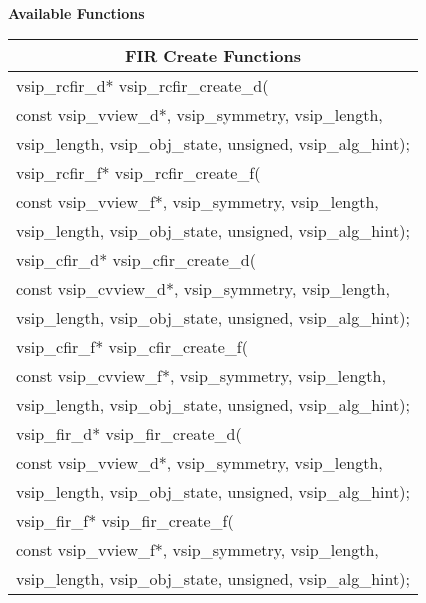 \\\cvsiplh 
\newline \hspace*{.8cm} \vspace*{.1cm} \textbf{Available Functions }
\newline \hspace*{1.cm} {
\ttfamily
\begin{tabular}[H]{|l|}
\multicolumn{1}{c}{\rmfamily \bfseries FIR Create Functions\vspace{.1cm}}\\ \hline
vsip\_rcfir\_d* vsip\_rcfir\_create\_d(\\*\hspace{.6cm}const vsip\_vview\_d*, vsip\_symmetry, vsip\_length,\\*\hspace{.6cm}vsip\_length, vsip\_obj\_state, unsigned, vsip\_alg\_hint);\\
vsip\_rcfir\_f* vsip\_rcfir\_create\_f(\\*\hspace{.6cm}const vsip\_vview\_f*, vsip\_symmetry, vsip\_length,\\*\hspace{.6cm}vsip\_length, vsip\_obj\_state, unsigned, vsip\_alg\_hint);\\
vsip\_cfir\_d* vsip\_cfir\_create\_d(\\*\hspace{.6cm}const vsip\_cvview\_d*, vsip\_symmetry, vsip\_length,\\*\hspace{.6cm}vsip\_length, vsip\_obj\_state, unsigned, vsip\_alg\_hint);\\
vsip\_cfir\_f* vsip\_cfir\_create\_f(\\*\hspace{.6cm}const vsip\_cvview\_f*, vsip\_symmetry, vsip\_length,\\*\hspace{.6cm}vsip\_length, vsip\_obj\_state, unsigned, vsip\_alg\_hint);\\
vsip\_fir\_d* vsip\_fir\_create\_d(\\*\hspace{.6cm}const vsip\_vview\_d*, vsip\_symmetry, vsip\_length,\\*\hspace{.6cm}vsip\_length, vsip\_obj\_state, unsigned, vsip\_alg\_hint);\\
vsip\_fir\_f* vsip\_fir\_create\_f(\\*\hspace{.6cm}const vsip\_vview\_f*, vsip\_symmetry, vsip\_length,\\*\hspace{.6cm}vsip\_length, vsip\_obj\_state, unsigned, vsip\_alg\_hint);\\\hline
\end{tabular}\vspace{.1cm}
}
